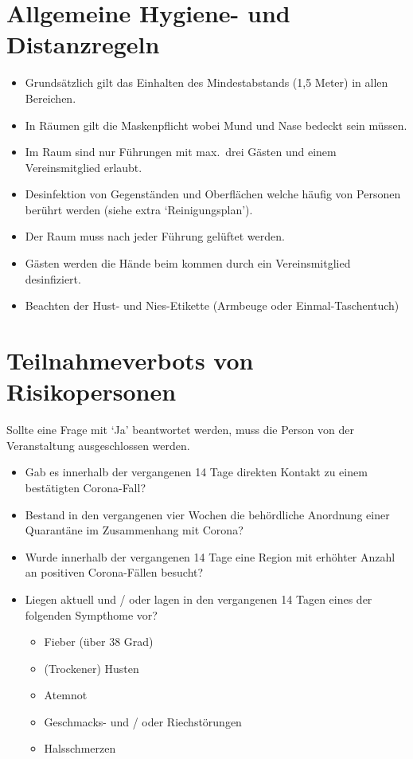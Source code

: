 \documentclass[10pt,a4paper]{scrartcl}
\begin{document}
\section{Allgemeine Hygiene- und Distanzregeln}
\begin{itemize}
\item Grundsätzlich gilt das Einhalten des Mindestabstands (1,5 Meter) in allen Bereichen.
\item In Räumen gilt die Maskenpflicht wobei Mund und Nase bedeckt sein müssen.
\item Im Raum sind nur Führungen mit max.\ drei Gästen und einem Vereinsmitglied erlaubt.
\item Desinfektion von Gegenständen und Oberflächen welche häufig von Personen berührt werden (siehe extra `Reinigungsplan').
\item Der Raum muss nach jeder Führung gelüftet werden.
\item Gästen werden die Hände beim kommen durch ein Vereinsmitglied desinfiziert.
\item Beachten der Hust- und Nies-Etikette (Armbeuge oder Einmal-Taschentuch)
\end{itemize}


\pagebreak

\section{Teilnahmeverbots von Risikopersonen}
Sollte eine Frage mit `Ja' beantwortet werden, muss die Person von der Veranstaltung ausgeschlossen werden.
\begin{itemize}
  \item Gab es innerhalb der vergangenen 14 Tage direkten Kontakt zu einem bestätigten Corona-Fall?
  \item Bestand in den vergangenen vier Wochen die behördliche Anordnung einer Quarantäne im Zusammenhang mit Corona?
  \item Wurde innerhalb der vergangenen 14 Tage eine Region mit erhöhter Anzahl an positiven Corona-Fällen besucht?
  \item Liegen aktuell und / oder lagen in den vergangenen 14 Tagen eines der folgenden Sympthome vor?
  \begin{itemize}
    \item Fieber (über 38 Grad)
    \item (Trockener) Husten
    \item Atemnot
    \item Geschmacks- und / oder Riechstörungen
    \item Halsschmerzen
  \end{itemize}
\end{itemize}
\end{document}
